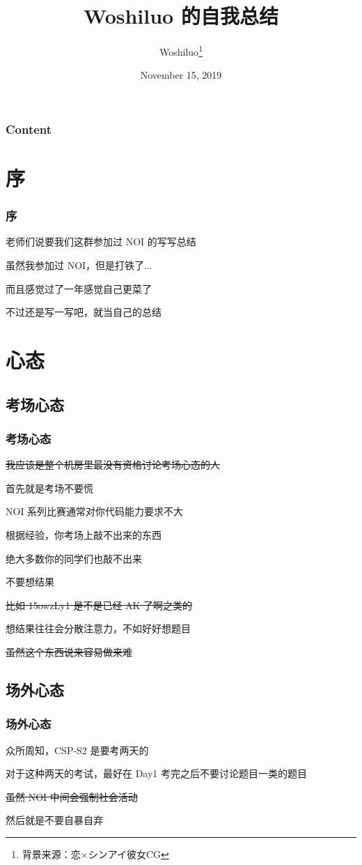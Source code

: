 \documentclass[10pt]{beamer}
\title{ Woshiluo 的自我总结}
\author{Woshiluo\footnote{背景来源：恋×シンアイ彼女CG}}
\institute{My blog: \href{https://blog.woshiluo.com}{https://blog.woshiluo.com}}
\date{November 15, 2019}
\begin{document}
    \frame{\titlepage}
 
	\begin{frame}
		\frametitle{Content}
		\tableofcontents
    \end{frame}

	\section{序}

    \begin{frame}
        \frametitle{序}
        老师们说要我们这群参加过 NOI 的写写总结

		虽然我参加过 NOI，但是打铁了...

		而且感觉过了一年感觉自己更菜了

		不过还是写一写吧，就当自己的总结
    \end{frame}

	\section{心态}

	\subsection{考场心态}
	\begin{frame}
		\frametitle{考场心态}
		\sout{我应该是整个机房里最没有资格讨论考场心态的人}
		
		\pause

		首先就是考场不要慌

		NOI 系列比赛通常对你代码能力要求不大

		根据经验，你考场上敲不出来的东西

		绝大多数你的同学们也敲不出来

		\pause

		不要想结果

		\sout{比如 15owzLy1 是不是已经 AK 了啊之类的}

		想结果往往会分散注意力，不如好好想题目

		\sout{虽然这个东西说来容易做来难}
	\end{frame}

	\subsection{场外心态}
	\begin{frame}
		\frametitle{场外心态}
		众所周知，CSP-S2 是要考两天的

		\pause
		

		对于这种两天的考试，最好在 Day1 考完之后不要讨论题目一类的题目

		\sout{虽然 NOI 中间会强制社会活动}

		\pause
		

		然后就是不要自暴自弃
	\end{frame}
\end{document}
